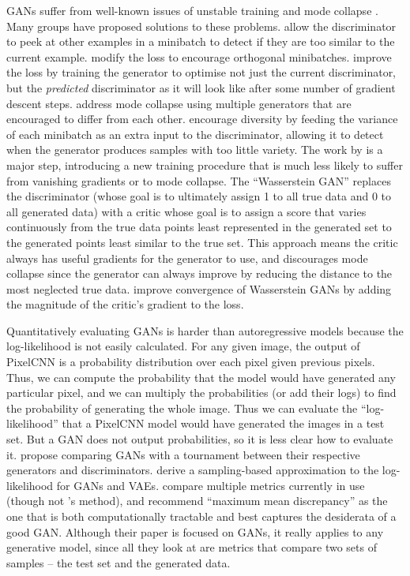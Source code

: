 \documentclass[10pt,a4paper]{article}
\newcommand{\nquote}[1]{``{#1}''}
\begin{document}
GANs suffer from well-known issues of unstable training and mode collapse \citep{gantechniques}. Many groups have proposed solutions to these problems. \citet{gantechniques} allow the discriminator to peek at other examples in a minibatch to detect if they are too similar to the current example. \citet{energygan} modify the loss to encourage orthogonal minibatches. \citet{unrolledgan} improve the loss by training the generator to optimise not just the current discriminator, but the \emph{predicted} discriminator as it will look like after some number of gradient descent steps. \citet{multiagentgan} address mode collapse using multiple generators that are encouraged to differ from each other. \citet{progressivegrowing} encourage diversity by feeding the variance of each minibatch as an extra input to the discriminator, allowing it to detect when the generator produces samples with too little variety. The work by \citet{wgan} is a major step, introducing a new training procedure that is much less likely to suffer from vanishing gradients or to mode collapse. The \nquote{Wasserstein GAN} replaces the discriminator (whose goal is to ultimately assign 1 to all true data and 0 to all generated data) with a critic whose goal is to assign a score that varies continuously from the true data points least represented in the generated set to the generated points least similar to the true set. This approach means the critic always has useful gradients for the generator to use, and discourages mode collapse since the generator can always improve by reducing the distance to the most neglected true data. \citet{improvedwgans} improve convergence of Wasserstein GANs by adding the magnitude of the critic's gradient to the loss.

Quantitatively evaluating GANs is harder than autoregressive models because the log-likelihood is not easily calculated. For any given image, the output of PixelCNN is a probability distribution over each pixel given previous pixels. Thus, we can compute the probability that the model would have generated any particular pixel, and we can multiply the probabilities (or add their logs) to find the probability of generating the whole image. Thus we can evaluate the \nquote{log-likelihood} that a PixelCNN model would have generated the images in a test set. But a GAN does not output probabilities, so it is less clear how to evaluate it. \citet{gantournament} propose comparing GANs with a tournament between their respective generators and discriminators. \citet{likelihoodestimation} derive a sampling-based approximation to the log-likelihood for GANs and VAEs. \citet{ganmetrics} compare multiple metrics currently in use (though not \citet{likelihoodestimation}'s method), and recommend \nquote{maximum mean discrepancy} \citep{mmd} as the one that is both computationally tractable and best captures the desiderata of a good GAN. Although their paper is focused on GANs, it really applies to any generative model, since all they look at are metrics that compare two sets of samples -- the test set and the generated data.
\end{document}
